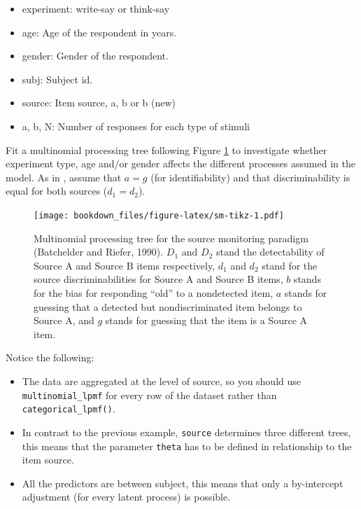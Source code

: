 \documentclass[12pt,]{krantz}
\providecommand{\tightlist}{%
  \setlength{\itemsep}{0pt}\setlength{\parskip}{0pt}}
\theoremstyle{definition}
\theoremstyle{definition}
\theoremstyle{definition}
\theoremstyle{remark}
\begin{document}
\begin{itemize}
\tightlist
\item
  experiment: write-say or think-say
\item
  age: Age of the respondent in years.
\item
  gender: Gender of the respondent.
\item
  subj: Subject id.
\item
  source: Item source, a, b or b (new)
\item
  a, b, N: Number of responses for each type of stimuli
\end{itemize}

Fit a multinomial processing tree following Figure \ref{fig:sm-tikz} to
investigate whether experiment type, age and/or gender affects the
different processes assumed in the model. As in
\citet{batchelder1990multinomial}, assume that \(a = g\) (for
identifiability) and that discriminability is equal for both sources
(\(d_1 = d_2\)).










\begin{figure}
\centering
\texttt{[image: bookdown\_files/figure-latex/sm-tikz-1.pdf]}
\caption{\label{fig:sm-tikz}Multinomial processing tree for the source monitoring
paradigm (Batchelder and Riefer, 1990). \(D_1\) and \(D_2\) stand the
detectability of Source A and Source B items respectively, \(d_1\) and
\(d_2\) stand for the source discriminabilities for Source A and Source
B items, \(b\) stands for the bias for responding ``old'' to a
nondetected item, \(a\) stands for guessing that a detected but
nondiscriminated item belongs to Source A, and \(g\) stands for guessing
that the item is a Source A item.}
\end{figure}

Notice the following:

\begin{itemize}
\tightlist
\item
  The data are aggregated at the level of source, so you should use
  \texttt{multinomial\_lpmf} for every row of the dataset rather than
  \texttt{categorical\_lpmf()}.
\item
  In contrast to the previous example, \texttt{source} determines three
  different trees, this means that the parameter \texttt{theta} has to
  be defined in relationship to the item source.
\item
  All the predictors are between subject, this means that only a
  by-intercept adjustment (for every latent process) is possible.
\end{itemize}
\end{document}
